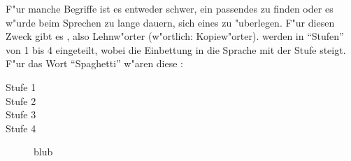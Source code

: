 F"ur manche Begriffe ist es entweder schwer, ein passendes  zu finden oder es w"urde beim Sprechen zu lange dauern,
sich eines zu "uberlegen. F"ur diesen Zweck gibt es , also Lehnw"orter (w"ortlich: Kopiew"orter).
 werden in ``Stufen'' von 1 bis 4 eingeteilt, wobei die Einbettung in die Sprache mit der Stufe steigt.
F"ur das Wort ``Spaghetti'' w"aren diese :
\begin{description}
\item[Stufe 1] 
\item[Stufe 2] 
\item[Stufe 3] 
\item[Stufe 4] blub
\end{description}
